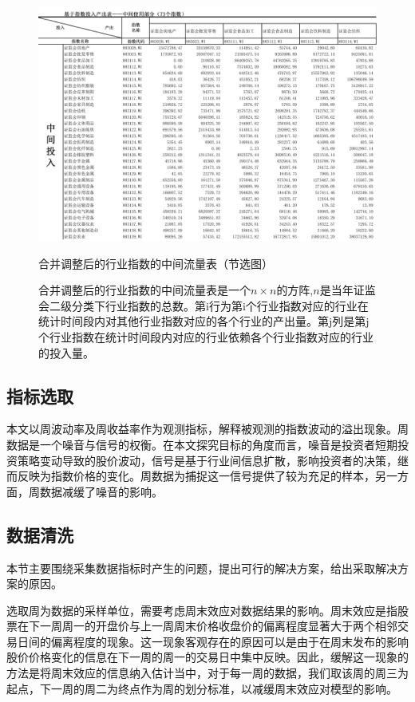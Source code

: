 \documentclass{sysuthesis}
\begin{document}
  \begin{figure}[htbp]
  \centering
  \includegraphics[scale=0.6]{image/合并调整后的中间流量表.png}
  \caption{合并调整后的行业指数的中间流量表（节选图）}
  \caption*{\footnotesize 合并调整后的行业指数的中间流量表是一个$n \times n$的方阵,$n$是当年证监会二级分类下行业指数的总数。第i行为第i个行业指数对应的行业在统计时间段内对其他行业指数对应的各个行业的产出量。第j列是第j个行业指数在统计时间段内对应的行业依赖各个行业指数对应的行业的投入量。}
  \label{fig:reorganized-ioaccount}
  \end{figure}

\subsection {指标选取} 
本文以周波动率及周收益率作为观测指标，解释被观测的指数波动的溢出现象。周数据是一个噪音与信号的权衡。在本文探究目标的角度而言，噪音是投资者短期投资策略变动导致的股价波动，信号是基于行业间信息扩散，影响投资者的决策，继而反映为指数价格的变化。周数据为捕捉这一信号提供了较为充足的样本，另一方面，周数据减缓了噪音的影响。

\subsection {数据清洗}
本节主要围绕采集数据指标时产生的问题，提出可行的解决方案，给出采取解决方案的原因。

选取周为数据的采样单位，需要考虑周末效应对数据结果的影响。周末效应是指股票在下一周周一的开盘价与上一周周末价格收盘价的偏离程度显著大于两个相邻交易日间的偏离程度的现象。这一现象客观存在的原因可以是由于在周末发布的影响股价价格变化的信息在下一周的周一的交易日中集中反映。因此，缓解这一现象的方法是将周末效应的信息纳入估计当中，对于每一周的数据，我们取该周的周三为起点，下一周的周二为终点作为周的划分标准，以减缓周末效应对模型的影响。
\end{document}
